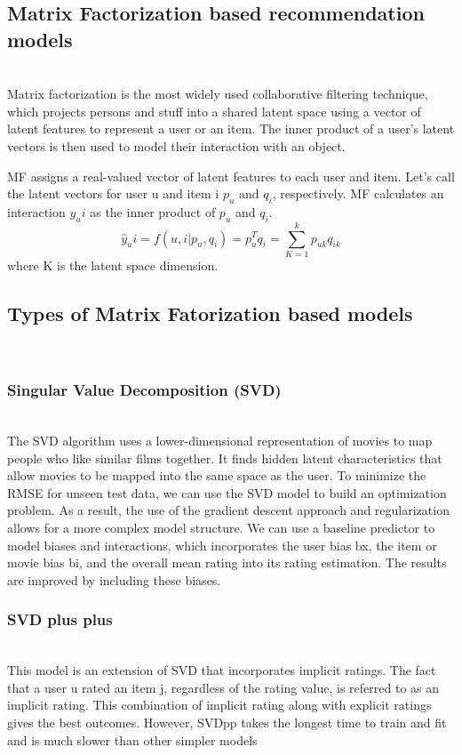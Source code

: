 \documentclass[sigconf]{acmart}
\begin{document}
\subsection{Matrix Factorization based recommendation models}\\
Matrix factorization is the most widely used collaborative filtering technique, which projects persons and stuff into a shared latent space using a vector of latent features to represent a user or an item. 
The inner product of a user's latent vectors is then used to model their interaction with an object.

MF assigns a real-valued vector of latent features to each user and item. Let's call the latent vectors for user u and item i $p_u$ and $q_i$,  respectively. MF calculates an interaction $y_ui$ as the inner product of $p_u$ and $q_i$.
$$
\hat{y}_ui = f(u, i|p_u, q_i ) = p_u^T q_i = \sum_{K=1}^k p_{uk}q_{ik} 
$$
where K is the latent space dimension.\\

\subsection{Types of Matrix Fatorization based models}\\
\subsubsection{\textbf{Singular Value Decomposition (SVD)}}\\
\newline
The SVD algorithm uses a lower-dimensional representation of movies to map people who like similar films together. 
It finds hidden latent characteristics that allow movies to be mapped into the same space as the user. To minimize the RMSE for unseen test data, we can use the SVD model to build an optimization problem. As a result, the use of the gradient descent approach and regularization allows for a more complex model structure. 
We can use a baseline predictor to model biases and interactions, which incorporates the user bias bx, the item or movie bias bi, and the overall mean rating into its rating estimation. The results are improved by including these biases.

\subsubsection{\textbf{SVD plus plus}}\\
This model is an extension of SVD that incorporates implicit ratings. The fact that a user u rated an item j, regardless of the rating value, is referred to as an implicit rating.
This combination of implicit rating along with explicit ratings gives the best outcomes. However, SVDpp takes the longest
time to train and fit and is much slower than other simpler models
\end{document}
